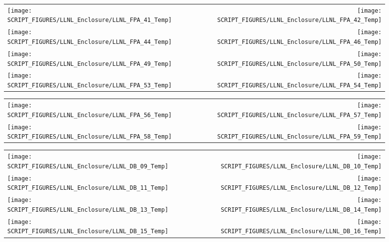 \begin{figure}[!ht]
\begin{tabular*}{\textwidth}{l@{\extracolsep{\fill}}r}
\texttt{[image: SCRIPT\_FIGURES/LLNL\_Enclosure/LLNL\_FPA\_41\_Temp]} &
\texttt{[image: SCRIPT\_FIGURES/LLNL\_Enclosure/LLNL\_FPA\_42\_Temp]} \\
\texttt{[image: SCRIPT\_FIGURES/LLNL\_Enclosure/LLNL\_FPA\_44\_Temp]} &
\texttt{[image: SCRIPT\_FIGURES/LLNL\_Enclosure/LLNL\_FPA\_46\_Temp]} \\
\texttt{[image: SCRIPT\_FIGURES/LLNL\_Enclosure/LLNL\_FPA\_49\_Temp]} &
\texttt{[image: SCRIPT\_FIGURES/LLNL\_Enclosure/LLNL\_FPA\_50\_Temp]} \\
\texttt{[image: SCRIPT\_FIGURES/LLNL\_Enclosure/LLNL\_FPA\_53\_Temp]} &
\texttt{[image: SCRIPT\_FIGURES/LLNL\_Enclosure/LLNL\_FPA\_54\_Temp]}
\end{tabular*}
\end{figure}

\begin{figure}[!ht]
\begin{tabular*}{\textwidth}{l@{\extracolsep{\fill}}r}
\texttt{[image: SCRIPT\_FIGURES/LLNL\_Enclosure/LLNL\_FPA\_56\_Temp]} &
\texttt{[image: SCRIPT\_FIGURES/LLNL\_Enclosure/LLNL\_FPA\_57\_Temp]} \\
\texttt{[image: SCRIPT\_FIGURES/LLNL\_Enclosure/LLNL\_FPA\_58\_Temp]} &
\texttt{[image: SCRIPT\_FIGURES/LLNL\_Enclosure/LLNL\_FPA\_59\_Temp]}
\end{tabular*}
\end{figure}

\begin{figure}[!ht]
\begin{tabular*}{\textwidth}{l@{\extracolsep{\fill}}r}
\texttt{[image: SCRIPT\_FIGURES/LLNL\_Enclosure/LLNL\_DB\_09\_Temp]} &
\texttt{[image: SCRIPT\_FIGURES/LLNL\_Enclosure/LLNL\_DB\_10\_Temp]} \\
\texttt{[image: SCRIPT\_FIGURES/LLNL\_Enclosure/LLNL\_DB\_11\_Temp]} &
\texttt{[image: SCRIPT\_FIGURES/LLNL\_Enclosure/LLNL\_DB\_12\_Temp]} \\
\texttt{[image: SCRIPT\_FIGURES/LLNL\_Enclosure/LLNL\_DB\_13\_Temp]} &
\texttt{[image: SCRIPT\_FIGURES/LLNL\_Enclosure/LLNL\_DB\_14\_Temp]} \\
\texttt{[image: SCRIPT\_FIGURES/LLNL\_Enclosure/LLNL\_DB\_15\_Temp]} &
\texttt{[image: SCRIPT\_FIGURES/LLNL\_Enclosure/LLNL\_DB\_16\_Temp]}
\end{tabular*}
\end{figure}

